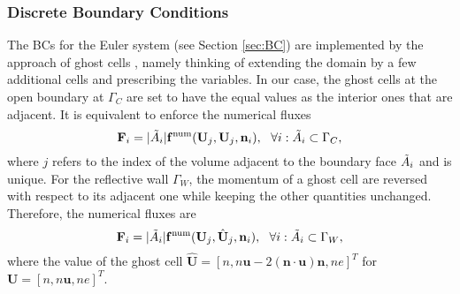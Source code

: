 \documentclass{article}
\begin{document}
\subsubsection{Discrete Boundary Conditions}
The BCs for the Euler system (see Section \ref{sec:BC}) are implemented by the approach of ghost cells \cite[][Chapt. 7]{leveque_2007}, namely thinking of extending the domain by a few additional cells and prescribing the variables. In our case, the ghost cells at the open boundary at $\Gamma_C$ are set to have the equal values as the interior ones that are adjacent. It is equivalent to enforce the numerical fluxes
\begin{equation*}
    \mathbf{F}_i = |\Tilde{A}_i|{\mathbf{f}^\text{num}}(\mathbf{U}_j, \mathbf{U}_j, \mathbf{n}_i), \ \ \forall i: \Tilde{A}_i \subset \Gamma_C,
\end{equation*}
where $j$ refers to the index of the volume adjacent to the boundary face $\Tilde{A}_i$ and is unique. For the reflective wall $\Gamma_W$, the momentum of a ghost cell are reversed with respect to its adjacent one while keeping the other quantities unchanged. Therefore, the numerical fluxes are 
\begin{equation*}
    \mathbf{F}_i = |\Tilde{A}_i|\mathbf{f}^\text{num}(\mathbf{U}_j, \hat{\mathbf{U}}_j, \mathbf{n}_i), \ \ \forall i: \Tilde{A}_i \subset \Gamma_W,
\end{equation*}
where the value of the ghost cell $\hat{\mathbf{U}} = [n, n\mathbf{u} - 2(\mathbf{n}\cdot\mathbf{u})\mathbf{n}, ne]^T$ for $\mathbf{U} = [n, n\mathbf{u}, ne]^T$. 
\end{document}
